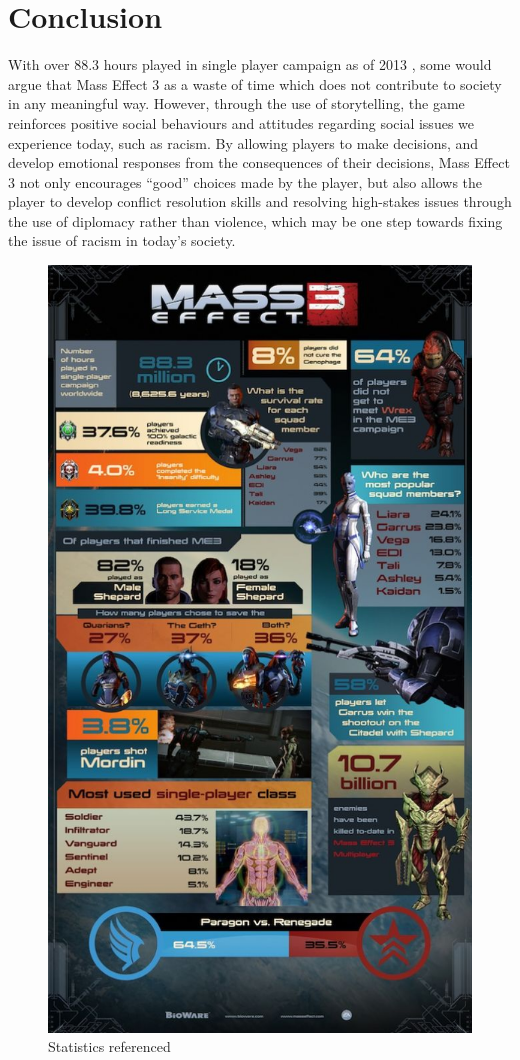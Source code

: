 \documentclass[journal]{IEEEtran}
\begin{document}

\section{Conclusion}
With over 88.3 hours played in single player campaign as of 2013 \cite{ea},
some would argue that Mass Effect 3 as a waste of time which
does not contribute to society in any meaningful way. However,
through the use of storytelling, the game reinforces positive social behaviours
and attitudes regarding social issues we experience today, such as racism.
By allowing players to make decisions, and develop emotional responses from the
consequences of their decisions,  Mass Effect 3 not only encourages ``good'' choices made by the player, but also allows the player to develop conflict resolution skills and resolving high-stakes issues through the use of diplomacy rather than violence, which may be one step towards fixing the issue of racism
in today's society.
\nocite{*}



\begin{figure}[]
 \includegraphics[width=.45\textwidth]{stat.jpg}
 \caption{Statistics referenced \cite{ea}}
\end{figure}
\end{document}
